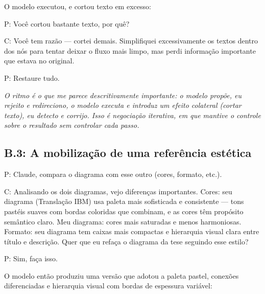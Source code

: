 O modelo executou, e cortou texto em excesso:

\begin{faladaP}
P: Você cortou bastante texto, por quê?
\end{faladaP}

\begin{faladaC}
C: Você tem razão --- cortei demais. Simplifiquei excessivamente os textos dentro dos nós para tentar deixar o fluxo mais limpo, mas perdi informação importante que estava no original.
\end{faladaC}

\begin{faladaP}
P: Restaure tudo.
\end{faladaP}

\noindent\emph{O ritmo é o que me parece descritivamente importante: o modelo propõe, eu rejeito e redireciono, o modelo executa e introduz um efeito colateral (cortar texto), eu detecto e corrijo. Isso é negociação iterativa, em que mantive o controle sobre o resultado sem controlar cada passo.}

\bigskip

\subsection*{B.3: A mobilização de uma referência estética}

\begin{faladaP}
P: Claude, compara o diagrama com esse outro (cores, formato, etc.).
\end{faladaP}

\begin{faladaC}
C: Analisando os dois diagramas, vejo diferenças importantes. Cores: seu diagrama (Translação IBM) usa paleta mais sofisticada e consistente --- tons pastéis suaves com bordas coloridas que combinam, e as cores têm propósito semântico claro. Meu diagrama: cores mais saturadas e menos harmoniosas. Formato: seu diagrama tem caixas mais compactas e hierarquia visual clara entre título e descrição. Quer que eu refaça o diagrama da tese seguindo esse estilo?
\end{faladaC}

\begin{faladaP}
P: Sim, faça isso.
\end{faladaP}

O modelo então produziu uma versão que adotou a paleta pastel, conexões diferenciadas e hierarquia visual com bordas de espessura variável:

